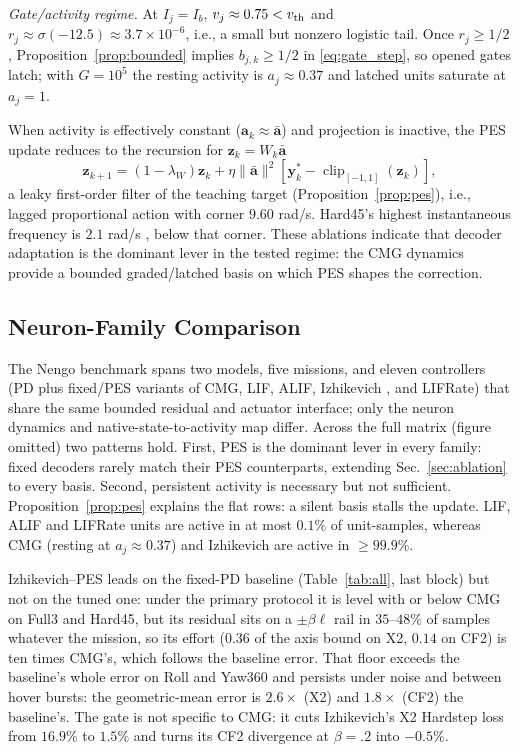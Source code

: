 \documentclass[letterpaper, 10 pt, conference]{ieeeconf}
\newcommand{\clip}{\operatorname{clip}}
\begin{document}
\emph{Gate/activity regime.} At $I_j=I_b$, $v_j\approx0.75<v_{\rm th}$ and $r_j\approx\sigma(-12.5)\approx3.7\times10^{-6}$, i.e., a small but nonzero logistic tail. Once $r_j\ge1/2$, Proposition~\ref{prop:bounded} implies $b_{j,k}\ge1/2$ in \eqref{eq:gate_step}, so opened gates latch; with $G=10^5$ the resting activity is $a_j\approx0.37$ and latched units saturate at $a_j=1$.

When activity is effectively constant ($\bm a_k\approx\bar{\bm a}$) and projection is inactive, the PES update reduces to the recursion for $\bm z_k=W_k\bar{\bm a}$
\begin{equation}
 \bm z_{k+1}=(1-\lambda_W)\bm z_k
 +\eta\|\bar{\bm a}\|^2[\bm y_k^*-\clip_{[-1,1]}(\bm z_k)],
 \label{eq:constantbasis}
\end{equation}
a leaky first-order filter of the teaching target (Proposition~\ref{prop:pes}), i.e., lagged proportional action with corner $9.60$ rad/s. Hard45's highest instantaneous frequency is $2.1$ rad/s \cite{sandoval2018instantaneous}, below that corner. These ablations indicate that decoder adaptation is the dominant lever in the tested regime: the CMG dynamics provide a bounded graded/latched basis on which PES shapes the correction.

\subsection{Neuron-Family Comparison}
\label{sec:family}

The Nengo benchmark spans two models, five missions, and eleven controllers (PD plus fixed/PES variants of CMG, LIF, ALIF, Izhikevich \cite{izhikevich2003}, and LIFRate) that share the same bounded residual and actuator interface; only the neuron dynamics and native-state-to-activity map differ. Across the full matrix (figure omitted) two patterns hold. First, PES is the dominant lever in every family: fixed decoders rarely match their PES counterparts, extending Sec.~\ref{sec:ablation} to every basis. Second, persistent activity is necessary but not sufficient. Proposition~\ref{prop:pes} explains the flat rows: a silent basis stalls the update. LIF, ALIF and LIFRate units are active in at most $0.1\%$ of unit-samples, whereas CMG (resting at $a_j\approx0.37$) and Izhikevich are active in ${\ge}99.9\%$.

Izhikevich--PES leads on the fixed-PD baseline (Table~\ref{tab:all}, last block) but not on the tuned one: under the primary protocol it is level with or below CMG on Full3 and Hard45, but its residual sits on a $\pm\beta\ell$ rail in $35$--$48\%$ of samples whatever the mission, so its effort ($0.36$ of the axis bound on X2, $0.14$ on CF2) is ten times CMG's, which follows the baseline error. That floor exceeds the baseline's whole error on Roll and Yaw360 and persists under noise and between hover bursts: the geometric-mean error is $2.6\times$ (X2) and $1.8\times$ (CF2) the baseline's. The gate is not specific to CMG: it cuts Izhikevich's X2 Hardstep loss from $16.9\%$ to $1.5\%$ and turns its CF2 divergence at $\beta=.2$ into $-0.5\%$.
\end{document}
